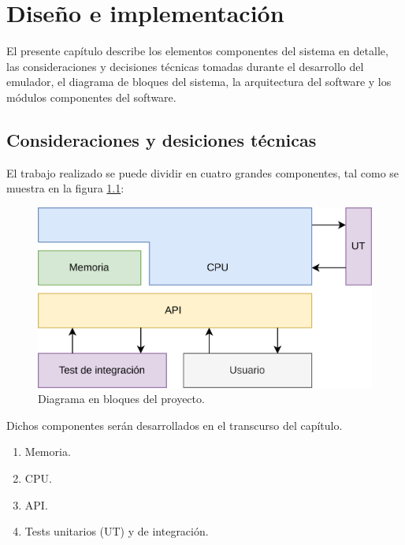 \chapter{Diseño e implementación} %
\label{Chapter3}

El presente capítulo describe los elementos componentes del sistema en detalle, las consideraciones y decisiones técnicas tomadas durante el desarrollo del emulador, el diagrama de bloques del sistema, la arquitectura del software y los módulos componentes del software.



\section{Consideraciones y desiciones técnicas}
\label{sec:consideraciones_decisiones_tecnicas}

El trabajo realizado se puede dividir en cuatro grandes componentes, tal como se muestra en la figura \ref{fig:diagrama_bloques}:

\begin{figure}[htbp]
	\centering
	\includegraphics[width=.85\textwidth]{./Figures/diagrama_bloques}
	\caption{Diagrama en bloques del proyecto.}
	\label{fig:diagrama_bloques}
\end{figure}

Dichos componentes serán desarrollados en el transcurso del capítulo.

\begin{enumerate}
\item Memoria.
\item CPU.
\item API.
\item Tests unitarios (UT) y de integración.
\end{enumerate}

